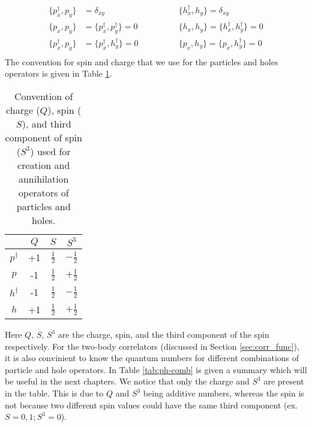 \begin{equation}
    \begin{aligned}
        \{ p^\dagger_x, p_y \} &= \delta_{xy} &\{ h^\dagger_x, h_y \} = \delta_{xy}
        \\
        \{ p_x, p_y \} &= \{ p^\dagger_x, p^\dagger_y \} = 0 &\{ h_x, h_y \} = \{ h^\dagger_x, h^\dagger_y \} = 0
        \\
        \{ p^\dagger_x, p_y \} &= \{ p^\dagger_x, h^\dagger_y \} = 0 \qquad\qquad &\{ p_x, h_y \} = \{ p_x, h^\dagger_y \} = 0
        \\
    \end{aligned}
\end{equation}
The convention for spin and charge that we use for the particles and holes operators is given in Table \ref{tab:convention_operators}.
\begin{table}[h]
    \centering
    \begin{tabular}{c|ccc}
        & $Q$ & $S$ & $S^3$ \\
    \hline
        $p^\dagger$ & +1 & $\frac{1}{2}$ & $-\frac{1}{2}$ \\
        $p$ & -1 & $\frac{1}{2}$ & $+\frac{1}{2}$ \\
        $h^\dagger$ & -1 & $\frac{1}{2}$ & $-\frac{1}{2}$ \\
        $h$ & +1 & $\frac{1}{2}$ & $+\frac{1}{2}$ \\
    \end{tabular}
    \caption{Convention of charge ($Q$), spin ($S$), and third component of spin ($S^3$) used for creation and annihilation operators of particles and holes.}
    \label{tab:convention_operators}
\end{table}
Here $Q$, $S$, $S^3$ are the charge, spin, and the third component of the spin respectively. For the two-body correlators (discussed in Section \ref{sec:corr_func}), it is also convinient to know the quantum numbers for different combinations of particle and hole operators. In Table \ref{tab:ph-comb} is given a summary which will be useful in the next chapters. We notice that only the charge and $S^3$ are present in the table. This is due to $Q$ and $S^3$ being additive numbers, whereas the spin is not because two different spin values could have the same third component (ex. $S=0,1;S^3=0$).
